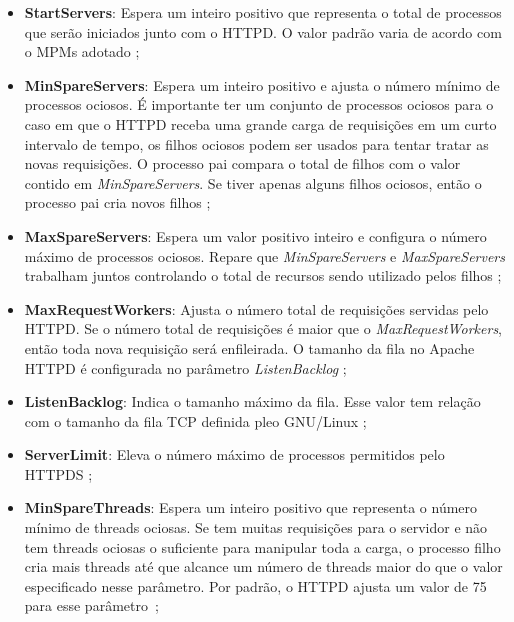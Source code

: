 \begin{itemize}
  \item \textbf{StartServers}:
Espera um inteiro positivo que representa o total de processos que serão
iniciados junto com o HTTPD.  O valor padrão varia de acordo com o MPMs adotado
\citep{mpm_start_server};

  \item \textbf{MinSpareServers}:
Espera um inteiro positivo e ajusta o número mínimo de processos ociosos. É
importante ter um conjunto de processos ociosos para o caso em que o HTTPD
receba uma grande carga de requisições em um curto intervalo de tempo, os
filhos ociosos podem ser usados para tentar tratar as novas requisições. O
processo pai compara o total de filhos com o valor contido em
\textit{MinSpareServers}. Se tiver apenas alguns filhos ociosos, então o
processo pai cria novos filhos \citep{mpm_min_spare};

  \item \textbf{MaxSpareServers}:
Espera um valor positivo inteiro e configura o número máximo de processos
ociosos. Repare que \textit{MinSpareServers} e \textit{MaxSpareServers}
trabalham juntos controlando o total de recursos sendo utilizado pelos filhos
\citep{mpm_max_spare};

  \item \textbf{MaxRequestWorkers}:
Ajusta o número total de requisições servidas pelo HTTPD. Se o número total de
requisições é maior que o \textit{MaxRequestWorkers}, então toda nova
requisição será enfileirada. O tamanho da fila no Apache HTTPD é configurada no
parâmetro \textit{ListenBacklog} \citep{mpm_max_request};

  \item \textbf{ListenBacklog}:
Indica o tamanho máximo da fila.  Esse valor tem relação com o
tamanho da fila TCP definida pleo GNU/Linux \citep{mpm_listen};

  \item \textbf{ServerLimit}:
Eleva o número máximo de processos permitidos pelo HTTPDS
\citep{mpm_server_limit};

  \item \textbf{MinSpareThreads}:
Espera um inteiro positivo que representa o número mínimo de threads ociosas.
Se tem muitas requisições para o servidor e não tem threads ociosas o
suficiente para manipular toda a carga, o processo filho cria mais threads até
que alcance um número de threads maior do que o valor especificado nesse
parâmetro.  Por padrão, o HTTPD ajusta um valor de 75 para esse
parâmetro~\citep{mpm_minsparethreads};


\end{itemize}
